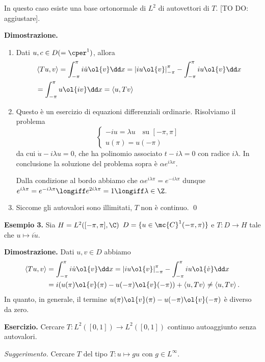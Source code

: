 In questo caso esiste una base ortonormale di $L^2$ di autovettori di $T$. [TO DO: aggiustare].

\textbf{Dimostrazione.} 
\begin{enumerate}

	\item Dati $u,c \in D (= \cper^1)$, allora
	\begin{align*}
		& \left<Tu,v \right> = \int_{-\pi}^\pi i \dot u \ol{v} \dd x = \left| i u \ol{v} \right|_{-\pi}^\pi - \int_{-\pi}^\pi i u \ol{v} \dd x \\
		& = \int_{-\pi}^\pi u \ol{iv} \dd x 
		= \left<u, Tv \right>
	\end{align*}


	\item Questo è un esercizio di equazioni differenziali ordinarie. Risolviamo il problema
	$$
	\begin{cases}
		-iu = \lambda u \quad \text{su } [-\pi,\pi] \\
		u(\pi) = u(-\pi)
	\end{cases} 
	$$
	da cui $\dot u - i \lambda u = 0$, che ha polinomio associato $t - i\lambda = 0$ con radice  $i\lambda$. In conclusione la soluzione del problema sopra è $\alpha e^{i\lambda x}$.

	Dalla condizione al bordo abbiamo che $\alpha e^{i\lambda \pi} = e^{-i\lambda \pi}$ dunque $e^{i\lambda \pi} = e^{- i\lambda \pi} \longiff e^{2i\lambda \pi} = 1 \longiff \lambda \in \Z$.


	\item Siccome gli autovalori sono illimitati, $T$ non è continuo.
\qed

\end{enumerate}


\textbf{Esempio 3.} Sia $H = L^2([-\pi,\pi], \C)$ $D = \{ u \in \mc{C}^1(-\pi,\pi) \}$ e $T \colon D \to H$ tale che $u \mapsto i\dot u$.

\textbf{Dimostrazione.} Dati $u,v \in D$ abbiamo
\begin{align*}
	\left<Tu,v \right> & = \int_{-\pi}^{\pi} i \dot u \ol{v} \dd x  = \left| i u \ol{v} \right|_{-\pi}^\pi - \int_{-\pi}^\pi i u \ol{\dot v} \dd x \\
	& = i (u(\pi) \ol{v}(\pi) - u(- \pi) \ol{v}(-\pi)) + \left<u, Tv \right> \neq \left<u, Tv \right>.
\end{align*}
In quanto, in generale, il termine $u(\pi) \ol{v}(\pi) - u(- \pi) \ol{v}(-\pi)$ è diverso da zero.


\textbf{Esercizio.} Cercare $T \colon L^2([0,1]) \to L^2([0,1])$ continuo autoaggiunto senza autovalori.

\textit{Suggerimento.} Cercare $T$ del tipo $T \colon u \mapsto gu$ con $g \in L^\infty$.
